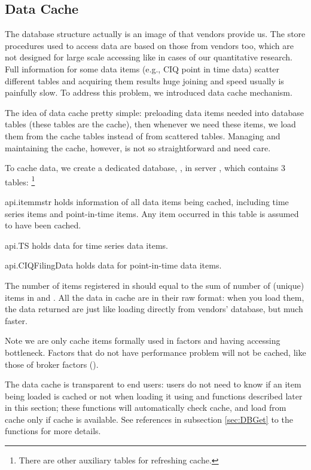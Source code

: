 \subsection{Data Cache}

The database structure actually is an image of that vendors provide us.
The store procedures used to access data are based on those from vendors too,
which are not designed for large scale accessing like in cases of our quantitative research.
Full information for some data items (e.g., CIQ point in time data) scatter different tables
and acquiring them results huge joining and speed usually is painfully slow.
To address this problem, we introduced data cache mechanism.

The idea of data cache pretty simple:
preloading data items needed into database tables (these tables are the cache),
then whenever we need these items, we load them from the cache tables instead of from scattered tables.
Managing and maintaining the cache, however, is not so straightforward and need care.

To cache data, we create a dedicated database, , in server ,
which contains 3 tables:
\footnote{There are other auxiliary tables for refreshing cache.}
\begin{argdesc}
  \item [api.itemmstr] holds information of all data items being cached, 
         including time series items and point-in-time items.
         Any item occurred in this table is assumed to have been cached.
  \item [api.TS] holds data for time series data items.
  \item [api.CIQFilingData] holds data for point-in-time data items.
\end{argdesc}

The number of items registered in  should equal to the sum
of number of (unique) items in  and .
All the data in cache are in their raw format:
when you load them, the data returned are just like loading directly from vendors' database,
but much faster.

Note we are only cache items formally used in factors and having accessing bottleneck.
Factors that do not have performance problem will not be cached, like those 
of broker factors ().

The data cache is transparent to end users:
users do not need to know if an item being loaded is cached or not when loading it using 
and  functions described later in this section;
these functions will automatically check cache, 
and load from cache only if cache is available.
See references in subsection \ref{sec:DBGet} to the functions for more details.

